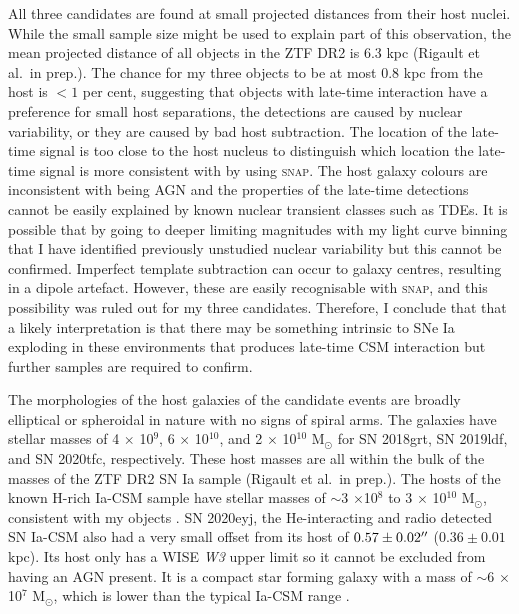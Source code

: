 \documentclass[a4paper,oneside,12pt, class=Latex/Classes/PhDthesisPSnPDF, crop=false]{standalone}
\begin{document}
All three candidates are found at small projected distances from their host nuclei. While the small sample size might be used to explain part of this observation, the mean projected distance of all objects in the ZTF DR2 is 6.3 kpc (Rigault et al.~in prep.). The chance for my three objects to be at most 0.8 kpc from the host is $<1$ per cent, suggesting that objects with late-time interaction have a preference for small host separations, the detections are caused by nuclear variability, or they are caused by bad host subtraction. The location of the late-time signal is too close to the host nucleus to distinguish which location the late-time signal is more consistent with by using \textsc{snap}. The host galaxy colours are inconsistent with being AGN and the properties of the late-time detections cannot be easily explained by known nuclear transient classes such as TDEs. It is possible that by going to deeper limiting magnitudes with my light curve binning that I have identified previously unstudied nuclear variability but this cannot be confirmed. Imperfect template subtraction can occur to galaxy centres, resulting in a dipole artefact. However, these are easily recognisable with \textsc{snap}, and this possibility was ruled out for my three candidates. Therefore, I conclude that that a likely interpretation is that there may be something intrinsic to SNe Ia exploding in these environments that produces late-time CSM interaction but further samples are required to confirm.

The morphologies of the host galaxies of the candidate events are broadly elliptical or spheroidal in nature with no signs of spiral arms. The galaxies have stellar masses of 4 $\times$ 10$^9$, 6 $\times$ 10$^10$, and 2 $\times$ 10$^{10}$ M$_\odot$ for SN 2018grt, SN 2019ldf, and SN 2020tfc, respectively. These host masses are all within the bulk of the masses of the ZTF DR2 SN Ia sample (Rigault et al.~in prep.). The hosts of the known H-rich Ia-CSM sample have stellar masses of $\sim$3 $\times$10$^8$ to 3 $\times$ 10$^{10}$ M$_\odot$, consistent with my objects \citep{Ia-CSM_BTS}. SN 2020eyj, the He-interacting and radio detected SN Ia-CSM \citep{Kool_He_CSM} also had a very small offset from its host of $0.57\pm0.02^{\prime\prime}$ ($0.36\pm0.01$ kpc). Its host only has a WISE \textit{W3} upper limit so it cannot be excluded from having an AGN present. It is a compact star forming galaxy with a mass of $\sim$6 $\times$ 10$^7$ M$_\odot$, which is lower than the typical Ia-CSM range \citep{Ia-CSM_BTS}. 
\end{document}
